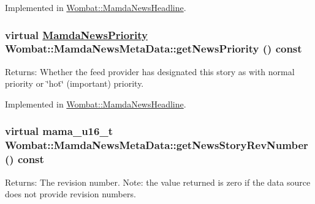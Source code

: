Implemented in \hyperlink{classWombat_1_1MamdaNewsHeadline_dfa06642c61fa25ebd63f55d587f54fe}{Wombat::Mamda\-News\-Headline}.\hypertarget{classWombat_1_1MamdaNewsMetaData_1d004d2cccd57b8cdb88bc0bae62d685}{
\subsubsection[getNewsPriority]{\setlength{\rightskip}{0pt plus 5cm}virtual \hyperlink{namespaceWombat_faa7709d230f261c8aeb71420f6dd012}{Mamda\-News\-Priority} Wombat::Mamda\-News\-Meta\-Data::get\-News\-Priority () const}}
\label{classWombat_1_1MamdaNewsMetaData_1d004d2cccd57b8cdb88bc0bae62d685}


\begin{Desc}
\item[Returns:]Whether the feed provider has designated this story as with normal priority or \char`\"{}hot\char`\"{} (important) priority. \end{Desc}


Implemented in \hyperlink{classWombat_1_1MamdaNewsHeadline_716f900c705f9d4ee783bdb791779e68}{Wombat::Mamda\-News\-Headline}.\hypertarget{classWombat_1_1MamdaNewsMetaData_58b2e7b0cdd5e496b54df349b3b65676}{
\subsubsection[getNewsStoryRevNumber]{\setlength{\rightskip}{0pt plus 5cm}virtual mama\_\-u16\_\-t Wombat::Mamda\-News\-Meta\-Data::get\-News\-Story\-Rev\-Number () const}}
\label{classWombat_1_1MamdaNewsMetaData_58b2e7b0cdd5e496b54df349b3b65676}


\begin{Desc}
\item[Returns:]The revision number. Note: the value returned is zero if the data source does not provide revision numbers. \end{Desc}


